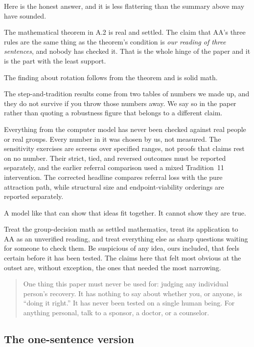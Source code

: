 \documentclass[11pt,a4paper]{article}
\begin{document}
Here is the honest answer, and it is less flattering than the summary above may
have sounded.

The mathematical theorem in A.2 is real and settled. The claim that AA's three
rules are the same thing as the theorem's condition is \emph{our reading of three
sentences}, and nobody has checked it. That is the whole hinge of the paper and it
is the part with the least support.

The finding about rotation follows from the theorem and is solid math.

The step-and-tradition results come from two tables of numbers we made up, and they
do not survive if you throw those numbers away. We say so in the paper rather than
quoting a robustness figure that belongs to a different claim.

Everything from the computer model has never been checked against real people or
real groups. Every number in it was chosen by us, not measured. The sensitivity
exercises are screens over specified ranges, not proofs that claims rest on no
number. Their strict, tied, and reversed outcomes must be reported separately,
and the earlier referral comparison used a mixed Tradition~11 intervention. The
corrected headline compares referral loss with the pure attraction path, while
structural size and endpoint-viability orderings are reported separately.

A model like that can show that ideas fit together. It cannot show they are true.

Treat the group-decision math as settled mathematics, treat its application to AA
as an unverified reading, and treat everything else as sharp questions waiting for
someone to check them. Be suspicious of any idea, ours included, that feels certain
before it has been tested. The claims here that felt most obvious at the outset
are, without exception, the ones that needed the most narrowing.

\begin{quote}\small
One thing this paper must never be used for: judging any individual person's
recovery. It has nothing to say about whether you, or anyone, is ``doing it
right.'' It has never been tested on a single human being. For anything personal,
talk to a sponsor, a doctor, or a counselor.
\end{quote}

\subsection{The one-sentence version}
\end{document}
